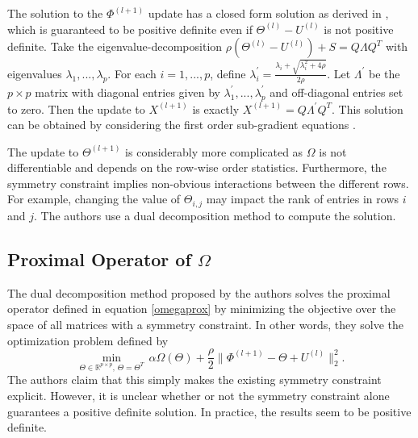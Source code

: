\documentclass{uwstat572}
\theoremstyle{remark}
\theoremstyle{definition}
\begin{document}
The solution to the $\Phi^{(l+1)}$ update has a closed form solution as derived in \citep{Boyd2011},  which is guaranteed to be positive definite even if $\Theta^{(l)} - U^{(l)}$ is not positive definite.  Take the eigenvalue-decomposition $\rho(\Theta^{(l)} - U^{(l)}) + S =  Q \Lambda Q^T$ with eigenvalues $\lambda_1,...,\lambda_p$.  For each $i = 1,...,p$, define $\lambda^{\prime}_i = \frac{\lambda_i + \sqrt{\lambda_i^2 + 4\rho}}{2 \rho}$.  Let $\Lambda^{\prime}$ be the $p \times p$ matrix with diagonal entries given by $\lambda^{\prime}_1,...,\lambda^{\prime}_p$ and off-diagonal entries set to zero.  Then the update to $X^{(l+1)}$ is exactly $X^{(l+1)} = Q \Lambda^{\prime} Q^T$. This solution can be obtained by considering the first order sub-gradient equations \citep{Boyd2011}.

The update to $\Theta^{(l+1)}$ is considerably more complicated as $\Omega$ is not differentiable and depends on the row-wise order statistics.  Furthermore, the symmetry constraint implies non-obvious interactions between the different rows.  For example, changing the value of $\Theta_{i,j}$ may impact the rank of entries in rows $i$ and $j$. The authors use a dual decomposition method to compute the solution.  


\subsection{Proximal Operator of $\Omega$}

The dual decomposition method proposed by the authors solves the proximal operator defined in equation \eqref{omegaprox} by minimizing the objective over the space of all matrices with a symmetry constraint.  In other words, they solve the optimization problem defined by
\begin{equation}\label{dualdecomp}
\min_{\Theta \in \mathbb{R}^{p \times p}, \, \Theta = \Theta^T} \, \alpha \Omega(\Theta) + \frac{\rho}{2} \| \Phi^{(l+1)} - \Theta + U^{(l)} \|_2^2.
\end{equation}
The authors claim that this simply makes the existing symmetry constraint explicit.  
However, it is unclear whether or not the symmetry constraint alone guarantees a positive definite solution. In practice, the results seem to be positive definite.
\end{document}
